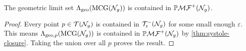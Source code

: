 \begin{corollary}
  \label{cor:geolimset}
  The geometric limit set $\Lambda_{\mathrm{geo}}(\mathrm{MCG}(\mathcal{N}_g))$ is contained in $\mathbb{P}\mathcal{MF}^+(\mathcal{N}_g)$.
\end{corollary}
\begin{proof}
  Every point $p \in \mathcal{T}(\mathcal{N}_g)$ is contained in $\mathcal{T}_{\varepsilon}^{-}(\mathcal{N}_g)$ for some small enough $\varepsilon$.
  This means $\Lambda_{\mathrm{geo}, p}(\mathrm{MCG}(\mathcal{N}_g))$ is contained in $\mathbb{P}\mathcal{MF}^+(\mathcal{N}_g)$ by \autoref{thm:systole-closure}.
  Taking the union over all $p$ proves the result.
\end{proof}



